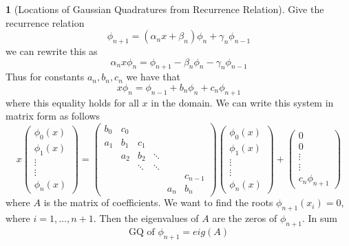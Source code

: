 \documentclass[12pt]{article}
\theoremstyle{definition}
\newtheorem{theorem}{\color{ForestGreen}{\textbf{Theorem}}}
\begin{document}
\begin{theorem}[Locations of Gaussian Quadratures from Recurrence Relation]
Give the recurrence relation
\begin{equation}
\phi_{n+1} = (\alpha_n x + \beta_n)\phi_n + \gamma_n \phi_{n-1}
\end{equation}
we can rewrite this as
\begin{equation}
\alpha_n x \phi_n = \phi_{n+1} - \beta_n \phi_n - \gamma_n \phi_{n-1}
\end{equation}
Thus for constants $a_n,b_n,c_n$ we have that
\begin{equation}
x \phi_n = \phi_{n-1} +  b_n \phi_n + c_n \phi_{n+1}
\end{equation}
where this equality holds for all $x$ in the domain. We can write this system in matrix form as follows
\begin{equation}
x
\begin{pmatrix}
\phi_0(x) \\ \phi_1(x) \\ \vdots \\ \vdots \\ \phi_n(x)
\end{pmatrix}
=
\begin{pmatrix}
b_0 & c_0 \\
a_1 & b_1 & c_1 \\
& a_2 & b_2 & \ddots \\
& & \ddots & \ddots \\
& & & & & c_{n-1} \\
& & & & a_n & b_n
\end{pmatrix}
\begin{pmatrix}
\phi_0(x) \\ \phi_1(x) \\ \vdots \\ \vdots \\ \phi_n(x)
\end{pmatrix}
+
\begin{pmatrix}
0 \\ 0 \\ \vdots \\ \vdots \\ c_n \phi_{n+1}
\end{pmatrix}
\end{equation}
where $A$ is the matrix of coefficients. We want to find the roots $\phi_{n+1}(x_i) = 0$, where $i=1,\ldots,n+1$. Then the eigenvalues of $A$ are the zeros of $\phi_{n+1}$. In sum
\begin{equation}
\text{GQ of } \phi_{n+1} = eig(A)
\end{equation}
\end{theorem}
\end{document}
